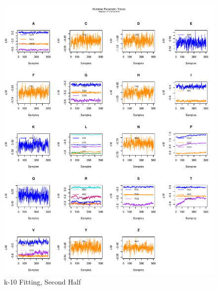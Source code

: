 \documentclass[11pt]{labbook}
\begin{document}
    \begin{figure}
        \centering
        \includegraphics[scale=.65]{FONSE_Plots/2016/December_14/k-10_mutation_final}
        \caption{k-10 Fitting, Second Half}
        \label{fig:k-10_2MUT}
    \end{figure}
\end{document}
